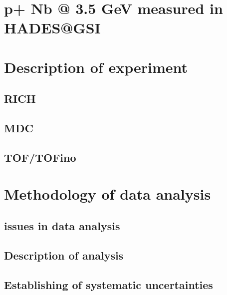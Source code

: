\section{p+ Nb @ 3.5 GeV measured in HADES@GSI}
\section{Description of experiment}
\subsection{RICH}
\subsection{MDC}
\subsection{TOF/TOFino}
\section{Methodology of data analysis}
\subsection{issues in data analysis}
\subsection{Description of analysis}
\subsection{Establishing of systematic uncertainties}